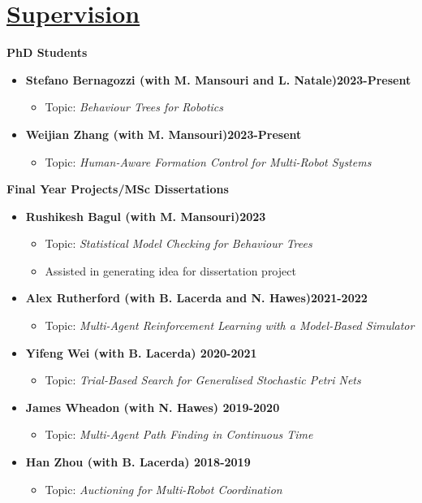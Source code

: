 \documentclass[11pt]{article}
\begin{document}
\section*{\underline{Supervision}}
\noindent \textbf{PhD Students}
\begin{itemize}
\item \textbf{Stefano Bernagozzi (with M. Mansouri and L. Natale)\hfill 2023-Present}
\begin{itemize}
\item Topic: \emph{Behaviour Trees for Robotics}
\end{itemize}
\item \textbf{Weijian Zhang (with M. Mansouri)\hfill 2023-Present}
\begin{itemize}
\item Topic: \emph{Human-Aware Formation Control for Multi-Robot Systems}
\end{itemize}
\end{itemize}


\noindent \textbf{Final Year Projects/MSc Dissertations}
\begin{itemize}
\item \textbf{Rushikesh Bagul (with M. Mansouri)\hfill 2023}
\begin{itemize}
\item Topic: \emph{Statistical Model Checking for Behaviour Trees}
\item Assisted in generating idea for dissertation project
\end{itemize}
\item \textbf{Alex Rutherford (with B. Lacerda and N. Hawes)\hfill 2021-2022}
\begin{itemize}
\item Topic: \emph{Multi-Agent Reinforcement Learning with a Model-Based Simulator}
\end{itemize}
\item \textbf{Yifeng Wei (with B. Lacerda) \hfill 2020-2021}
\begin{itemize}
\item Topic: \emph{Trial-Based Search for Generalised Stochastic Petri Nets}
\end{itemize} 
\item \textbf{James Wheadon (with N. Hawes) \hfill 2019-2020}
\begin{itemize}
\item  Topic: \emph{Multi-Agent Path Finding in Continuous Time}
\end{itemize}
\item \textbf{Han Zhou (with B. Lacerda) \hfill 2018-2019}
\begin{itemize}
\item Topic: \emph{Auctioning for Multi-Robot Coordination}
\end{itemize}
\end{itemize}
\end{document}
